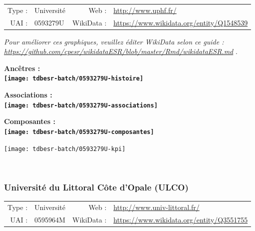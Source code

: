 \documentclass[12pt,french,]{article}
\begin{document}
\begin{tabular*}{\textwidth}{rp{5cm}rl}  
\hline  
Type : & Université & Web : &\href{http://www.uphf.fr/}{http://www.uphf.fr/} \\  
UAI : & 0593279U & WikiData : & \href{https://www.wikidata.org/entity/Q1548539}{https://www.wikidata.org/entity/Q1548539} \\  
\hline  
\end{tabular*}

\textit{\scriptsize Pour améliorer ces graphiques, veuillez éditer WikiData selon ce guide :  \href{https://github.com/cpesr/wikidataESR/blob/master/Rmd/wikidataESR.md}{https://github.com/cpesr/wikidataESR/blob/master/Rmd/wikidataESR.md}}
.

\vspace{1cm}  
\begin{minipage}[b]{0.50\textwidth}\begin{center} \bf Ancêtres : \\  
\texttt{[image: tdbesr-batch/0593279U-histoire]} \end{center}\end{minipage}\begin{minipage}[b]{0.50\textwidth}\begin{center} \bf Associations : \\  
\texttt{[image: tdbesr-batch/0593279U-associations]} \end{center}\end{minipage}

\hrulefill

\begin{center} \bf Composantes : \\  
\texttt{[image: tdbesr-batch/0593279U-composantes]} \end{center}

\begin{center}\texttt{[image: tdbesr-batch/0593279U-kpi]} \end{center}\checkoddpage

\ifoddpage \fi ~\newpage  

\hypertarget{universituxe9-du-littoral-cuxf4te-dopale-ulco}{%
\subsubsection{Université du Littoral Côte d'Opale
(ULCO)}\label{universituxe9-du-littoral-cuxf4te-dopale-ulco}}

\begin{tabular*}{\textwidth}{rp{5cm}rl}  
\hline  
Type : & Université & Web : &\href{http://www.univ-littoral.fr/}{http://www.univ-littoral.fr/} \\  
UAI : & 0595964M & WikiData : & \href{https://www.wikidata.org/entity/Q3551755}{https://www.wikidata.org/entity/Q3551755} \\  
\hline  
\end{tabular*}
\end{document}
